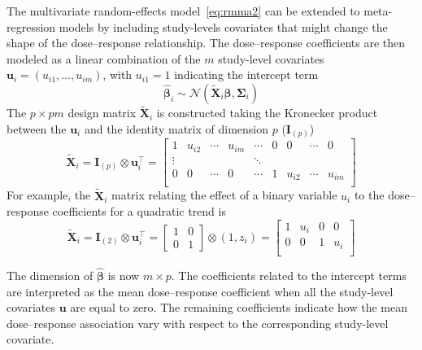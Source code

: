 \documentclass[11pt,a4paper,twoside,openany]{book}\usepackage{knitr}
\begin{document}
{\noindent The multivariate random-effects model~\ref{eq:rmma2} can be extended to meta-regression models by including study-levels covariates that might change the shape of the dose--response relationship. The dose--response coefficients are then modeled as a linear combination of the $m$ study-level covariates $\mathbf{u}_i = \left(u_{i1}, \dots, u_{im} \right)$, with $u_{i1} = 1$ indicating the intercept term
\begin{equation}
\boldsymbol{\hat \beta}_i \sim \mathcal{N}\left(\widetilde{\mathbf{X}}_i \boldsymbol{\beta}, \boldsymbol{\Sigma}_i\right)
\label{eq:rmmra2}
\end{equation}
\noindent The $p\times pm$ design matrix $\widetilde{\mathbf{X}}_i$ is constructed taking the Kronecker product between the $\mathbf{u}_i$ and the identity matrix of dimension $p$ ($\mathbf{I}_{(p)}$)
\begin{equation}
\widetilde{\mathbf{X}}_i = \mathbf{I}_{(p)} \otimes \mathbf{u}_i^\top = 
	\begin{bmatrix}
		1 & u_{i2} & \cdots & u_{im} & \cdots & 0 & 0 & \cdots & 0 \\
		\vdots &  &  &  & \ddots & &  &  &  \\
		0 & 0 & \cdots & 0 & \cdots & 1 & u_{i2} & \cdots & u_{im} \\
	\end{bmatrix}
\end{equation}
\noindent For example, the $\widetilde{\mathbf{X}}_i$ matrix relating the effect of a binary variable $u_i$ to the dose--response coefficients for a quadratic trend is
\begin{equation*}
\widetilde{\mathbf{X}}_i = \mathbf{I}_{(2)} \otimes \mathbf{u}_i^\top = 
	\begin{bmatrix}
		1 & 0 \\
		0 & 1
	\end{bmatrix} \otimes
	(1, z_i)=
	\begin{bmatrix}
		1 & u_i  & 0 & 0 \\
		0 & 0 & 1 & u_i  \\
	\end{bmatrix}
\end{equation*} 

\noindent The dimension of $\boldsymbol{\hat \beta}$ is now $m\times p$. The coefficients related to the intercept terms are interpreted as the mean dose--response coefficient when all the study-level covariates $\mathbf{u}$ are equal to zero. The remaining coefficients indicate how the mean dose--response association vary with respect to the corresponding study-level covariate.


}
\end{document}
